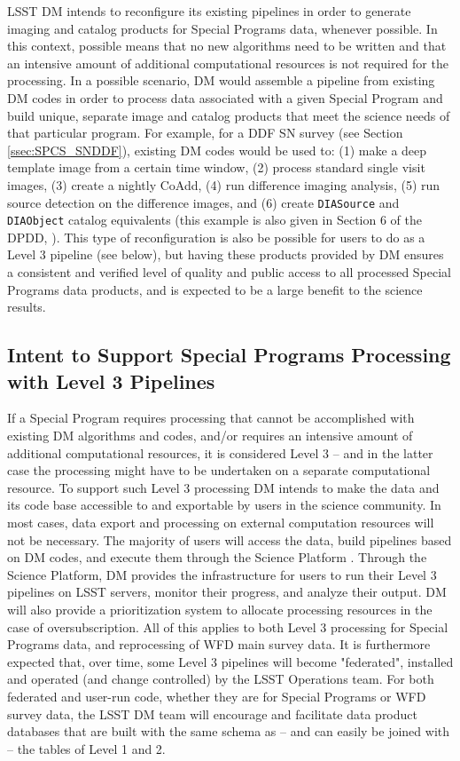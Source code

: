 \documentclass[DM,lsstdraft,toc]{lsstdoc}
\begin{document}
LSST DM intends to reconfigure its existing pipelines in order to generate imaging and catalog products for Special Programs data, whenever possible. In this context, possible means that no new algorithms need to be written and that an intensive amount of additional computational resources is not required for the processing. In a possible scenario, DM would assemble a pipeline from existing DM codes in order to process data associated with a given Special Program and build unique, separate image and catalog products that meet the science needs of that particular program. For example, for a DDF SN survey (see Section \ref{ssec:SPCS_SNDDF}), existing DM codes would be used to: (1) make a deep template image from a certain time window, (2) process standard single visit images, (3) create a nightly CoAdd, (4) run difference imaging analysis, (5) run source detection on the difference images, and (6) create {\tt DIASource} and {\tt DIAObject} catalog equivalents (this example is also given in Section 6 of the DPDD, \cite{LSE-163}). This type of reconfiguration is also be possible for users to do as a Level 3 pipeline (see below), but having these products provided by DM ensures a consistent and verified level of quality and public access to all processed Special Programs data products, and is expected to be a large benefit to the science results.


\subsection{Intent to Support Special Programs Processing with Level 3 Pipelines}\label{ssec:dmplans_L3}

If a Special Program requires processing that cannot be accomplished with existing DM algorithms and codes, and/or requires an intensive amount of additional computational resources, it is considered Level 3 -- and in the latter case the processing might have to be undertaken on a separate computational resource. To support such Level 3 processing DM intends to make the data and its code base accessible to and exportable by users in the science community. In most cases, data export and processing on external computation resources will not be necessary. The majority of users will access the data, build pipelines based on DM codes, and execute them through the Science Platform \cite{LDM-542}. Through the Science Platform, DM provides the infrastructure for users to run their Level 3 pipelines on LSST servers, monitor their progress, and analyze their output. DM will also provide a prioritization system to allocate processing resources in the case of oversubscription. All of this applies to both Level 3 processing for Special Programs data, and reprocessing of WFD main survey data. It is furthermore expected that, over time, some Level 3 pipelines will become "federated", installed and operated (and change controlled) by the LSST Operations team. For both federated and user-run code, whether they are for Special Programs or WFD survey data, the LSST DM team will encourage and facilitate data product databases that are built with the same schema as -- and can easily be joined with -- the tables of Level 1 and 2.
\end{document}
